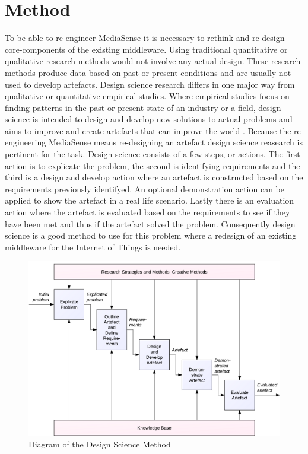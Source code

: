 \chapter{Method}
To be able to re-engineer MediaSense it is necessary to rethink and re-design core-components of the existing middleware. Using traditional quantitative or qualitative research methods would not involve any actual design. These research methods produce data based on past or present conditions and are usually not used to develop artefacts.
Design science research differs in one major way from qualitative or quantitative empirical studies. Where empirical studies focus on finding patterns in the past or present state of an industry or a field, design science is intended to design and develop new solutions to actual problems \cite{bider2012design} and aims to improve and create artefacts that can improve the world \cite{johannesson2012design}. Because the re-engineering MediaSense means re-designing an artefact design science reasearch is pertinent for the task.
Design science consists of a few steps, or actions. The first action is to explicate the problem, the second is identifying requirements and the third is a design and develop action where an artefact is constructed based on the requirements previously identifyed. An optional demonstration action can be applied to show the artefact in a real life scenario. Lastly there is an evaluation action where the artefact is evaluated based on the requirements to see if they have been met and thus if the artefact solved the problem. Consequently design science is a good method to use for this problem where a redesign of an existing middleware for the Internet of Things is needed.

\begin{figure}[h!]
	\centering
    	\includegraphics[scale=0.50]{part_3/design_science.png}
		\caption{Diagram of the Design Science Method \cite{johannesson2012design}} 
		\label{ds}
\end{figure}

